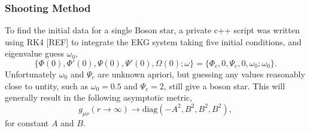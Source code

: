 \subsubsection{Shooting Method}

To find the initial data for a single Boson star, a private {c++} script was written using RK4 [REF] to integrate the EKG system taking five initial conditions, and eigenvalue guess $\omega_0$, 
\begin{equation} \{\Phi(0),\Phi'(0),\Psi(0),\Psi'(0),\Omega(0);\omega \} = \{ \Phi_c,0,\Psi_c,0,\omega_0;\omega_0\}.\end{equation}
Unfortunately $\omega_0$ and $\Psi_c$ are unknown apriori, but guessing any values reasonably close to untity, such as $\omega_0=0.5$ and $\Psi_c=2$, still give a boson star. This will generally result in the following asymptotic metric,
\begin{equation} g_{\mu\nu}(r\rightarrow\infty) \rightarrow \mathrm{diag}(-A^2,B^2,B^2,B^2), \label{grchombo:eq:ABBB}\end{equation}
 for constant $A$ and $B$. 

